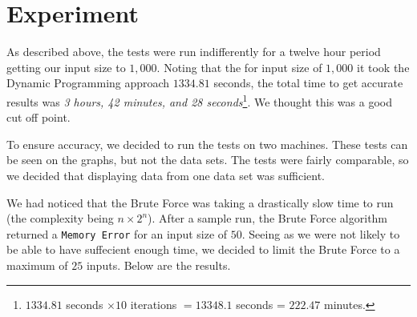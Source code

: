 \documentclass{article}
\begin{document}
\section{Experiment}
As described above, the tests were run indifferently for a twelve hour period getting our input size to $1,000$. Noting that the for input size of $1,000$ it took the Dynamic Programming approach $1334.81$ seconds, the total time to get accurate results was \textit{3 hours, 42 minutes, and 28 seconds}\footnote{$1334.81$ seconds $\times 10$ iterations $= 13348.1$ seconds = $222.47$ minutes.}. We thought this was a good cut off point.

To ensure accuracy, we decided to run the tests on two machines. These tests can be seen on the graphs, but not the data sets. The tests were fairly comparable, so we decided that displaying data from one data set was sufficient.

We had noticed that the Brute Force was taking a drastically slow time to run (the complexity being $n \times 2^n$). After a sample run, the Brute Force algorithm returned a \texttt{Memory Error} for an input size of $50$. Seeing as we were not likely to be able to have suffecient enough time, we decided to limit the Brute Force to a maximum of $25$ inputs. Below are the results.
\end{document}
